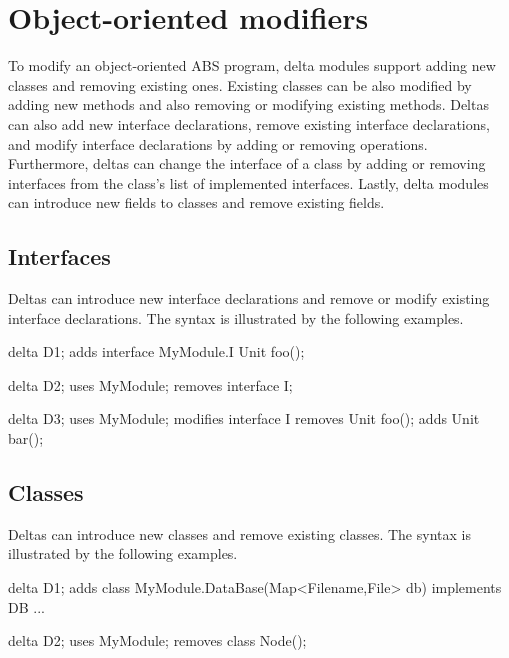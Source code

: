 
\section{Object-oriented modifiers}
To modify an object-oriented ABS program, delta modules support adding new
classes and removing existing ones. Existing classes can be also modified by
adding new methods and also removing or modifying existing methods.
Deltas can also add new interface declarations, remove existing interface
declarations, and modify interface declarations by adding or removing
operations. Furthermore, deltas can change the interface of a class by adding or
removing interfaces from the class's list of implemented interfaces. Lastly,
delta modules can introduce new fields to classes and remove existing fields.

\subsection{Interfaces}
Deltas can introduce new interface declarations and remove or modify existing
interface declarations. The syntax is illustrated by the following examples.
\begin{abscode}
delta D1;
adds interface MyModule.I { Unit foo(); }

delta D2; 
uses MyModule;
removes interface I;

delta D3;
uses MyModule;
modifies interface I { removes Unit foo(); adds Unit bar(); }
\end{abscode}


\subsection{Classes}
Deltas can introduce new classes and remove existing classes. The syntax is
illustrated by the following examples.
\begin{abscode}
delta D1;
adds class MyModule.DataBase(Map<Filename,File> db) implements DB {...}

delta D2; 
uses MyModule;
removes class Node();
\end{abscode}

